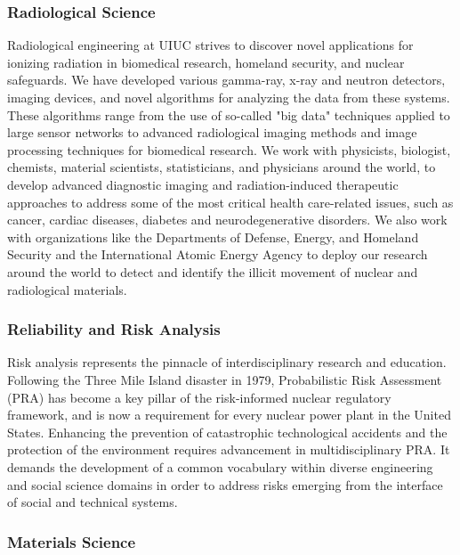 \documentclass[11pt, letterpaper]{article}
\begin{document}
\subsubsection{Radiological Science}
Radiological engineering at UIUC strives to discover novel applications for ionizing radiation in biomedical research, homeland security, and nuclear safeguards. We have developed various gamma-ray, x-ray and neutron detectors, imaging devices, and novel algorithms for analyzing the data from these systems. These algorithms range from the use of so-called "big data" techniques applied to large sensor networks to advanced radiological imaging methods and image processing techniques for biomedical research. We work with physicists, biologist, chemists, material scientists, statisticians, and physicians around the world, to develop advanced diagnostic imaging and radiation-induced therapeutic approaches to address some of the most critical health care-related issues, such as cancer, cardiac diseases, diabetes and neurodegenerative disorders. We also work with organizations like the Departments of Defense, Energy, and Homeland Security and the International Atomic Energy Agency to deploy our research around the world to detect and identify the illicit movement of nuclear and radiological materials.

\subsubsection{Reliability and Risk Analysis}
Risk analysis represents the pinnacle of interdisciplinary research and education. Following the Three Mile Island disaster in 1979, Probabilistic Risk Assessment (PRA) has become a key pillar of the risk-informed nuclear regulatory framework, and is now a requirement for every nuclear power plant in the United States. Enhancing the prevention of catastrophic technological accidents and the protection of the environment requires advancement in multidisciplinary PRA. It demands the development of a common vocabulary within diverse engineering and social science domains in order to address risks emerging from the interface of social and technical systems.


\subsubsection{Materials Science}
\end{document}
